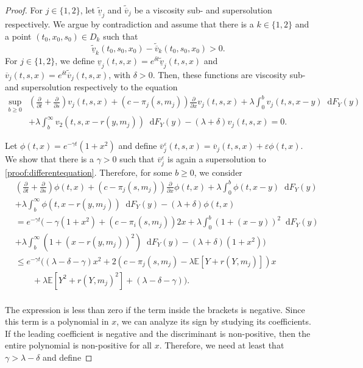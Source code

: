 \documentclass[a4paper]{scrartcl}
\theoremstyle{remark}
\theoremstyle{definition}
\numberwithin{equation}{section}
\newcommand*\diff{\mathop{}\!\mathrm{d}}
\begin{document}
\begin{proof}
    For $j \in \{1,2\}$, let $\tilde{\underline{v}}_j$ and $\tilde{\overline{v}}_j$ be a viscosity sub- and supersolution respectively. We argue by contradiction and assume that there is a $k \in \{1,2\}$ and a point $(t_0,x_0,s_0) \in D_k$ such that
    \begin{equation*}
        \tilde{\underline{v}}_k(t_0,s_0,x_0)-\tilde{\overline{v}}_k(t_0,s_0,x_0)>0.
    \end{equation*}
    For $j \in \{1,2\}$, we define $\underline{v}_j(t,s,x)=e^{\delta t}\tilde{\underline{v}}_j(t,s,x)$ and $\overline{v}_j(t,s,x)=e^{\delta t}\tilde{\overline{v}}_j(t,s,x)$, with $\delta>0$. Then, these functions are viscosity sub- and supersolution respectively to the equation
    \begin{align}
    \label{proof:differentequation}
          \sup_{b\geq 0}&\left(\frac{\partial}{\partial t}+\frac{\partial}{\partial s}\right) v_j(t,s,x)+\left(c-\pi_j(s,m_j)\right)\frac{\partial}{\partial x}v_j(t,s,x) \nonumber + \lambda \int_{0}^{b}v_j(t,s,x-y)\diff F_Y(y) \nonumber \\
    &+ \lambda \int_{b}^{\infty}v_2(t,s,x-r(y,m_j))\diff F_Y(y) - (\lambda + \delta) v_j(t,s,x)=0. 
    \end{align}
    
    
    
    Let $\phi(t,x)=e^{-\gamma t}(1+x^2)$ and define $\overline{v}_j^\varepsilon(t,s,x)=\overline{v}_j(t,s,x)+\varepsilon  \phi(t,x)$. We show that there is a $\gamma>0$ such that  $\overline{v}_j^\varepsilon$ is again a supersolution to \eqref{proof:differentequation}. Therefore, for some $b\geq 0$, we consider
    \begin{align*}
       &\left(\frac{\partial}{\partial t}+\frac{\partial}{\partial s}\right) \phi(t,x)+\left(c-\pi_j(s,m_j)\right)\frac{\partial}{\partial x}\phi(t,x) \nonumber + \lambda \int_{0}^{b}\phi(t,x-y)\diff F_Y(y) \nonumber \\
    &+ \lambda \int_{b}^{\infty}\phi(t,x-r(y,m_j))\diff F_Y(y) - (\lambda+\delta) \phi(t,x)\\
    & =  e^{-\gamma t} \Big(-\gamma(1+x^2)+(c-\pi_i(s,m_j))2x + \lambda  \int_{0}^{b}(1+(x-y))^2\diff F_Y(y) \nonumber \\
    &+ \lambda \int_{b}^{\infty}(1+(x-r(y,m_j))^2)\diff F_Y(y) - (\lambda + \delta)(1+x^2)\Big)\\
    &\leq e^{-\gamma t}\Big((\lambda-\delta-\gamma)x^2 + 2(c-\pi_j(s,m_j)-\lambda\mathbb{E}[Y+r(Y,m_j)])x\\&\qquad+\lambda\mathbb{E}[Y^2+r(Y,m_j)^2]+(\lambda-\delta-\gamma) \Big).
    \end{align*}
    \\
    The expression is less than zero if the term inside the brackets is negative. Since this term is a polynomial in $x$, we can analyze its sign by studying its coefficients. If the leading coefficient is negative and the discriminant is non-positive, then the entire polynomial is non-positive for all $x$. Therefore, we need at least that $\gamma>\lambda-\delta$ and define


\end{proof}
\end{document}
